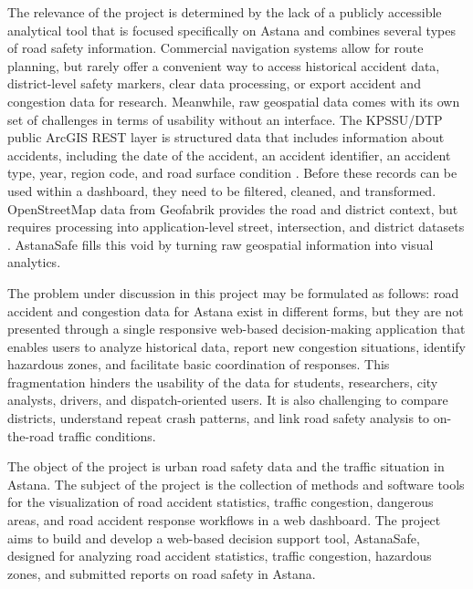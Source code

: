 ﻿\documentclass[12pt,a4paper]{report}
\begin{document}
The relevance of the project is determined by the lack of a publicly accessible analytical tool that is focused specifically on Astana and combines several types of road safety information. Commercial navigation systems allow for route planning, but rarely offer a convenient way to access historical accident data, district-level safety markers, clear data processing, or export accident and congestion data for research. Meanwhile, raw geospatial data comes with its own set of challenges in terms of usability without an interface. The KPSSU/DTP public ArcGIS REST layer is structured data that includes information about accidents, including the date of the accident, an accident identifier, an accident type, year, region code, and road surface condition \cite{kpssuDtp}. Before these records can be used within a dashboard, they need to be filtered, cleaned, and transformed. OpenStreetMap data from Geofabrik provides the road and district context, but requires processing into application-level street, intersection, and district datasets \cite{geofabrikKazakhstan}. AstanaSafe fills this void by turning raw geospatial information into visual analytics.

The problem under discussion in this project may be formulated as follows: road accident and congestion data for Astana exist in different forms, but they are not presented through a single responsive web-based decision-making application that enables users to analyze historical data, report new congestion situations, identify hazardous zones, and facilitate basic coordination of responses. This fragmentation hinders the usability of the data for students, researchers, city analysts, drivers, and dispatch-oriented users. It is also challenging to compare districts, understand repeat crash patterns, and link road safety analysis to on-the-road traffic conditions.

The object of the project is urban road safety data and the traffic situation in Astana. The subject of the project is the collection of methods and software tools for the visualization of road accident statistics, traffic congestion, dangerous areas, and road accident response workflows in a web dashboard. The project aims to build and develop a web-based decision support tool, AstanaSafe, designed for analyzing road accident statistics, traffic congestion, hazardous zones, and submitted reports on road safety in Astana.
\end{document}
